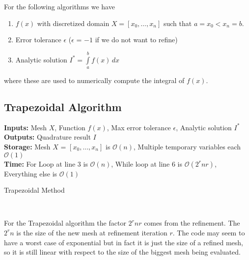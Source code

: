 \documentclass[12pt]{article}
\DeclarePairedDelimiter \abs{\lvert}{\rvert}%
\theoremstyle{remark}
\begin{document}
For the following algorithms we have 

\begin{enumerate}
	\item $f(x)$ with discretized domain $X = [x_0, \dots, x_n]$ such that $a = x_0 < x_n = b$.
	\item Error tolerance $\epsilon$ ($\epsilon$ = $-1$ if we do not want to refine)
	\item Analytic solution $I^* = \int\limits_a^b f(x) \, dx$
\end{enumerate}
where these are used to numerically compute the integral of $f(x)$. 

\subsection{Trapezoidal Algorithm}

\textbf{Inputs:} Mesh $X$, Function $f(x)$, Max error tolerance $\epsilon$, Analytic solution $I^*$ \\
\textbf{Outputs:} Quadrature result $I$ \\
\textbf{Storage:} Mesh $X$ = $[x_0, \dots, x_n]$ is $\mathcal{O}(n)$, Multiple temporary variables each $\mathcal{O}(1)$ \\
\textbf{Time:} For Loop at line 3 is $\mathcal{O}(n)$, While loop at line 6 is $\mathcal{O}(2^{r}nr)$, Everything else is $\mathcal{O}(1)$

\begin{algorithm}[H]
	\caption{Trapezoidal Method}
		\begin{algorithmic}[1]
			\EndFor
			\EndFor
			\EndWhile
			 \\
		\end{algorithmic}
\end{algorithm}

For the Trapezoidal algorithm the factor $2^rnr$ comes from the refinement. The $2^rn$ is the size of the new mesh at refinement iteration $r$. The code may seem to have a worst case of exponential but in fact it is just the size of a refined mesh, so it is still linear with respect to the size of the biggest mesh being evaluated.
\end{document}

